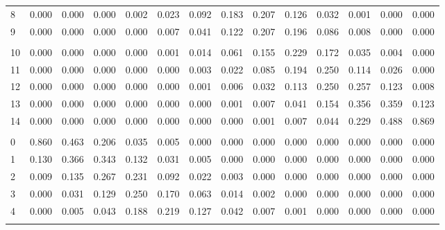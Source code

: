 \documentclass[
]{article}
\begin{document}
\begin{table}[H]
\begin{tabular}{lrrrrrrrrrrrrr}
\hspace{1em}8 & 0.000 & 0.000 & 0.000 & 0.002 & 0.023 & 0.092 & 0.183 & 0.207 & 0.126 & 0.032 & 0.001 & 0.000 & 0.000\\
\hspace{1em}9 & 0.000 & 0.000 & 0.000 & 0.000 & 0.007 & 0.041 & 0.122 & 0.207 & 0.196 & 0.086 & 0.008 & 0.000 & 0.000\\
\addlinespace[-.7em]
\multicolumn{14}{l}{ }\\
\hspace{1em}10 & 0.000 & 0.000 & 0.000 & 0.000 & 0.001 & 0.014 & 0.061 & 0.155 & 0.229 & 0.172 & 0.035 & 0.004 & 0.000\\
\hspace{1em}11 & 0.000 & 0.000 & 0.000 & 0.000 & 0.000 & 0.003 & 0.022 & 0.085 & 0.194 & 0.250 & 0.114 & 0.026 & 0.000\\
\hspace{1em}12 & 0.000 & 0.000 & 0.000 & 0.000 & 0.000 & 0.001 & 0.006 & 0.032 & 0.113 & 0.250 & 0.257 & 0.123 & 0.008\\
\hspace{1em}13 & 0.000 & 0.000 & 0.000 & 0.000 & 0.000 & 0.000 & 0.001 & 0.007 & 0.041 & 0.154 & 0.356 & 0.359 & 0.123\\
\hspace{1em}14 & 0.000 & 0.000 & 0.000 & 0.000 & 0.000 & 0.000 & 0.000 & 0.001 & 0.007 & 0.044 & 0.229 & 0.488 & 0.869\\
\addlinespace[0.3em]
\multicolumn{14}{l}{$n=15$}\\
\hspace{1em}0 & 0.860 & 0.463 & 0.206 & 0.035 & 0.005 & 0.000 & 0.000 & 0.000 & 0.000 & 0.000 & 0.000 & 0.000 & 0.000\\
\hspace{1em}1 & 0.130 & 0.366 & 0.343 & 0.132 & 0.031 & 0.005 & 0.000 & 0.000 & 0.000 & 0.000 & 0.000 & 0.000 & 0.000\\
\hspace{1em}2 & 0.009 & 0.135 & 0.267 & 0.231 & 0.092 & 0.022 & 0.003 & 0.000 & 0.000 & 0.000 & 0.000 & 0.000 & 0.000\\
\hspace{1em}3 & 0.000 & 0.031 & 0.129 & 0.250 & 0.170 & 0.063 & 0.014 & 0.002 & 0.000 & 0.000 & 0.000 & 0.000 & 0.000\\
\hspace{1em}4 & 0.000 & 0.005 & 0.043 & 0.188 & 0.219 & 0.127 & 0.042 & 0.007 & 0.001 & 0.000 & 0.000 & 0.000 & 0.000\\
\addlinespace[-.7em]

\end{tabular}
\end{table}
\end{document}
